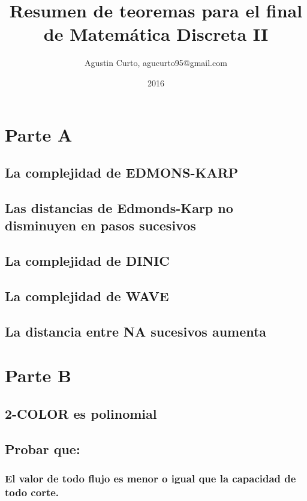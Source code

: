 \documentclass[12pt,a4paper]{report}
\author{Agustin Curto, agucurto95@gmail.com}
\title{Resumen de teoremas para el final \\ de Matemática Discreta  II}
\date{2016}
\begin{document}
\maketitle
\tableofcontents


\chapter{Parte A}

	\section{La complejidad de EDMONS-KARP}
	
	
	\section{Las distancias de Edmonds-Karp no disminuyen en pasos sucesivos}

	
	\section{La complejidad de DINIC}

	
	\section{La complejidad de WAVE}

	
	\section{La distancia entre NA sucesivos aumenta}
	


\chapter{Parte B}

	\section{2-COLOR es polinomial}
	
	
	\section{Probar que:}
	
		\subsection{El valor de todo flujo es menor o igual que la capacidad de todo corte.}
		
\end{document}
